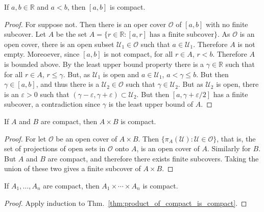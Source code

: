     \begin{theorem}
        If $a,b\in\mathbb{R}$ and $a<b$, then $[a,b]$ is compact.
    \end{theorem}
    \begin{proof}
        For suppose not. Then there is an oper cover $\mathcal{O}$ of
        $[a,b]$ with no finite subcover. Let $A$ be the set
        $A=\{r\in\mathbb{R}:[a,r]\textrm{ has a finite subcover}\}$.
        As $\mathcal{O}$ is an open cover, there is an open subset
        $\mathcal{U}_{1}\in\mathcal{O}$ such that $a\in\mathcal{U}_{1}$.
        Therefore $A$ is not empty. Moreoever, since $[a,b]$ is not compact,
        for all $r\in{A}$, $r<b$. Therefore $A$ is bounded above. By the
        least upper bound property there is a $\gamma\in\mathbb{R}$ such
        that for all $r\in{A}$, $r\leq\gamma$. But, as $\mathcal{U}_{1}$ is
        open and $a\in\mathcal{U}_{1}$, $a<\gamma\leq{b}$. But then
        $\gamma\in[a,b]$, and thus there is a
        $\mathcal{U}_{2}\in\mathcal{O}$ such that
        $\gamma\in\mathcal{U}_{2}$. But as $\mathcal{U}_{2}$ is open, there
        is an $\varepsilon>0$ such that
        $(\gamma-\varepsilon,\gamma+\varepsilon)\subset\mathcal{U}_{2}$.
        But then $[a,\gamma+\varepsilon/2]$ has a finite subcover, a
        contradiction since $\gamma$ is the least upper bound of $A$.
    \end{proof}
    \begin{theorem}
        \label{thm:product_of_compact_is_compact}%
        If $A$ and $B$ are compact, then $A\times{B}$ is compact.
    \end{theorem}
    \begin{proof}
        For let $\mathcal{O}$ be an open cover of $A\times{B}$. Then
        $\{\pi_{A}(\mathcal{U}):\mathcal{U}\in\mathcal{O}\}$, that is,
        the set of projections of open sets in $\mathcal{O}$ onto $A$,
        is an open cover of $A$. Similarly for $B$. But $A$ and $B$ are
        compact, and therefore there exists finite subcovers. Taking
        the union of these two gives a finite subcover of $A\times{B}$.
    \end{proof}
    \begin{theorem}
        \label{thm:finite_product_of_compact_is_compact}%
        If $A_{1},\hdots,A_{n}$ are compact, then
        $A_{1}\times\cdots\times{A_{n}}$ is compact.
    \end{theorem}
    \begin{proof}
        Apply induction to Thm.~\ref{thm:product_of_compact_is_compact}.
    \end{proof}
